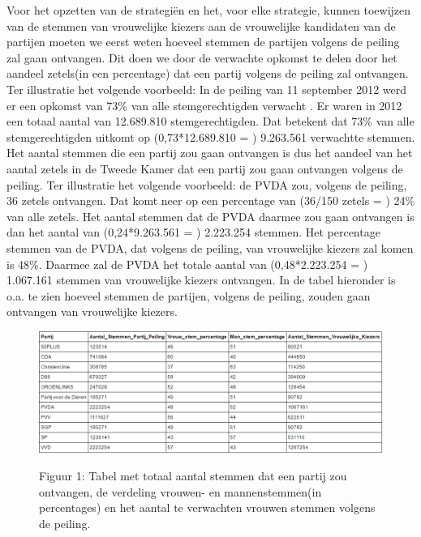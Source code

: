 Voor het opzetten van de strategi\"{e}n en het, voor elke strategie, kunnen toewijzen van de stemmen van vrouwelijke kiezers aan de vrouwelijke kandidaten van de partijen moeten we eerst weten hoeveel stemmen de partijen volgens de peiling zal gaan ontvangen. Dit doen we door de verwachte opkomst te delen door het aandeel zetels(in een percentage) dat een partij volgens de peiling zal ontvangen. Ter illustratie het volgende voorbeeld: In de peiling van 11 september 2012 werd er een opkomst van 73\% van alle stemgerechtigden verwacht . Er waren in 2012 een totaal aantal van 12.689.810 stemgerechtigden. Dat betekent dat 73\% van alle stemgerechtigden uitkomt op (0,73*12.689.810 = ) 9.263.561 verwachtte stemmen. Het aantal stemmen die een partij zou gaan ontvangen is dus het aandeel van het aantal zetels in de Tweede Kamer dat een partij zou gaan ontvangen volgens de peiling. Ter illustratie het volgende voorbeeld: de PVDA  zou, volgens de peiling,  36 zetels ontvangen. Dat komt neer op een percentage van (36/150 zetels = ) 24\% van alle zetels. Het aantal stemmen dat de PVDA daarmee zou gaan ontvangen is dan het aantal van (0,24*9.263.561 = ) 2.223.254 stemmen. Het percentage stemmen van de PVDA, dat volgens de peiling, van vrouwelijke kiezers zal komen is 48\%. Daarmee zal de PVDA het totale aantal van (0,48*2.223.254 = ) 1.067.161 stemmen van vrouwelijke kiezers ontvangen. In de tabel hieronder is o.a. te zien hoeveel stemmen de partijen, volgens de peiling, zouden gaan ontvangen van vrouwelijke kiezers.

\begin{figure}[H]
\begin{center}
	\includegraphics[width=\linewidth]	{stemmen_partij_df.png}
		\begin{center}
			Figuur 1: Tabel met totaal aantal stemmen dat een partij zou ontvangen, de verdeling vrouwen- en mannenstemmen(in percentages) en het aantal te verwachten vrouwen stemmen volgens de peiling. 
		\end{center}
\end{center}
\end{figure}

